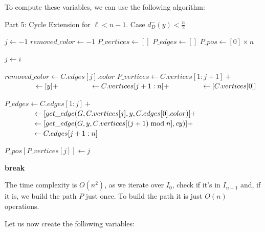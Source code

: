 To compute these variables, we can use the following algorithm:
\begin{algorithm}[H]
    \caption{Part 5: Cycle Extension for \( \ell < n - 1 \). Case \( d^-_D(y) < \frac{n}{2} \)}
    \begin{algorithmic}[1]
            \State $j \gets -1$
            \State $removed\_color \gets -1$
            \State $P\_vertices \gets []$
            \State $P\_edges \gets []$
            \State $P\_pos \gets [0] \times n$

                        \State \Return {}
                    \EndIf

                    \State $j \gets i$

                    \State $removed\_color \gets C.edges[j].color$
                    \State $P\_vertices \gets C.vertices[1:j+1] +$
                    \State $\hspace{4.3em} \gets [y] +$
                    \State $\hspace{4.3em} \gets C.vertices[j+1:n] +$
                    \State $\hspace{4.3em} \gets [C.vertices[0]]$

                    \State $P\_edges \gets C.edges[1:j] +$
                    \State $\hspace{4.1em} \gets [get\_edge(G, C.vertices[j], y, C.edges[0].color)] +$
                    \State $\hspace{4.1em} \gets [get\_edge(G, y, C.vertices[(j + 1) \bmod n], cy)] +$
                    \State $\hspace{4.1em} \gets C.edges[j+1:n]$

                        \State $P\_pos[P\_vertices[j]] \gets j$
                    \EndFor

                    \State \textbf{break}
                \EndIf
            \EndFor
        \EndFunction
    \end{algorithmic}
\end{algorithm}

The time complexity is $O(n^2)$, as we iterate over $I_0$, check if it's in $I_{n-1}$ and, if it is, we build the path $P$ just once.
To build the path it is just $O(n)$ operations.

Let us now create the following variables:

